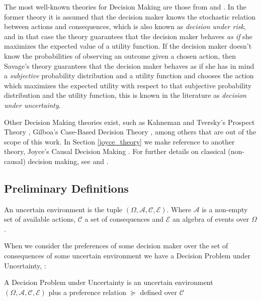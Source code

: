 \documentclass{svjour3}                     %
\begin{document}
The most well-known theories for Decision Making are those from \cite{von1944theory} and \cite{savage1954the}. In the former theory it is assumed that the decision maker knows the stochastic relation between actions and consequences, which is also known as \textit{decision under risk}, and in that case the theory guarantees that the decision maker behaves \textit{as if} she maximizes the expected value of a utility function. If the decision maker doesn't know the probabilities of observing an outcome given a chosen action, then Savage's theory guarantees that the decision maker behaves as if she has in mind a \textit{subjective} probability distribution and a utility function and chooses the action which maximizes the expected utility with respect to that subjective probability distribution and the utility function, this is known in the literature as \textit{decision under uncertainty}.

Other Decision Making theories exist, such as Kahneman and Tversky's Prospect Theory \citep{kahneman1979prospect}, Gilboa's Case-Based Decision Theory \citep{gilboa1995case}, among others that are out of the scope of this work. In Section \ref{joyce_theory} we make reference to another theory, Joyce's Causal Decision Making \citep{joyce1999foundations}. For further details on classical (non-causal) decision making, see \cite{bernardo2000bayesian} and \cite{gilboa2009decision}.

\subsection{Preliminary Definitions}
\begin{definition}
An uncertain environment is the tuple $(\Omega, \mathcal{A},\mathcal{C},\mathcal{E})$. Where $\mathcal{A}$ is a non-empty set of available actions, $\mathcal{C}$ a set of consequences and $\mathcal{E}$ an algebra of events over $\Omega$. 
\end{definition}

When we consider the preferences of some decision maker over the set of consequences of some uncertain environment we have a Decision Problem under Uncertainty, \cite{bernardo2000bayesian}:

\begin{definition}
A Decision Problem under Uncertainty is an uncertain environment $(\Omega, \mathcal{A},\mathcal{C},\mathcal{E})$ plus a preference relation $\succeq$ defined over $\mathcal{C}$ 
\end{definition}
\end{document}
